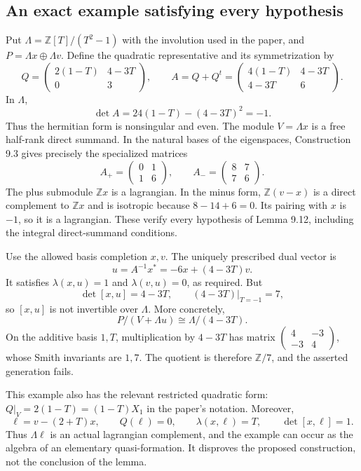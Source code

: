 \documentclass[10pt]{article}
\begin{document}
\subsection*{An exact example satisfying every hypothesis}
Put \(\Lambda=\mathbb Z[T]/(T^2-1)\) with the involution used in the paper, and \(P=\Lambda x\oplus\Lambda v\). Define the quadratic representative and its symmetrization by \[Q=\begin{pmatrix}2(1-T)&4-3T\\0&3\end{pmatrix},
 \qquad
 A=Q+Q^t=
 \begin{pmatrix}4(1-T)&4-3T\\4-3T&6\end{pmatrix}.\] In \(\Lambda\), \[\det A=24(1-T)-(4-3T)^2=-1.\] Thus the hermitian form is nonsingular and even. The module \(V=\Lambda x\) is a free half-rank direct summand. In the natural bases of the eigenspaces, Construction 9.3 gives precisely the specialized matrices \[A_+=\begin{pmatrix}0&1\\1&6\end{pmatrix},
 \qquad
 A_-=\begin{pmatrix}8&7\\7&6\end{pmatrix}.\] The plus submodule \(\mathbb Zx\) is a lagrangian. In the minus form, \(\mathbb Z(v-x)\) is a direct complement to \(\mathbb Zx\) and is isotropic because \(8-14+6=0\). Its pairing with \(x\) is \(-1\), so it is a lagrangian. These verify every hypothesis of Lemma 9.12, including the integral direct-summand conditions.\par
Use the allowed basis completion \(x,v\). The uniquely prescribed dual vector is \[u=A^{-1}x^*=-6x+(4-3T)v.\] It satisfies \(\lambda(x,u)=1\) and \(\lambda(v,u)=0\), as required. But \[\det[x,u]=4-3T,\qquad (4-3T)|_{T=-1}=7,\] so \([x,u]\) is not invertible over \(\Lambda\). More concretely, \[P/(V+\Lambda u)\cong \Lambda/(4-3T).\] On the additive basis \(1,T\), multiplication by \(4-3T\) has matrix \(\left(\begin{smallmatrix}4&-3\\-3&4\end{smallmatrix}\right)\), whose Smith invariants are \(1,7\). The quotient is therefore \(\mathbb Z/7\), and the asserted generation fails.\par
This example also has the relevant restricted quadratic form: \(Q|_V=2(1-T)=(1-T)X_1\) in the paper’s notation. Moreover, \[\ell=v-(2+T)x,\qquad Q(\ell)=0,\qquad
 \lambda(x,\ell)=T,\qquad \det[x,\ell]=1.\] Thus \(\Lambda\ell\) is an actual lagrangian complement, and the example can occur as the algebra of an elementary quasi-formation. It disproves the proposed construction, not the conclusion of the lemma.\par
\end{document}
